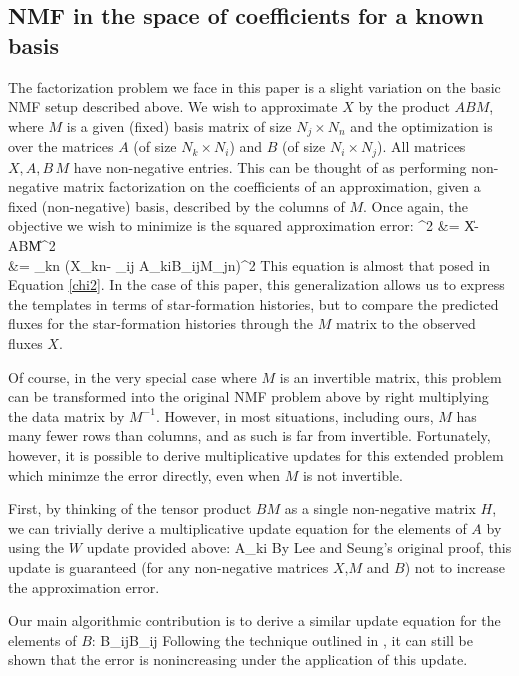 \documentclass[10pt,preprint]{aastex}
\def\beq#1\eeq{\begin{equation}#1\end{equation}}
\def\beqa#1\eeqa{\begin{align}#1\end{align}}
\newcommand{\T}{^{\scriptscriptstyle \top}}
\newcommand{\inv}{^{-1}}
\newcommand{\XX}{X}
\newcommand{\Xkn}{X_{kn}}
\renewcommand{\AA}{A}
\newcommand{\WW}{W}
\newcommand{\HH}{H}
\newcommand{\BB}{B}
\newcommand{\MM}{M}
\newcommand{\Aki}{A_{ki}}
\newcommand{\Bij}{B_{ij}}
\newcommand{\Mjn}{M_{jn}}
\begin{document}
\subsection{NMF in the space of coefficients for a known basis}
The factorization problem we face in this paper is a slight variation on the
basic NMF setup described above. We wish to approximate $\XX$ by the
product $\AA\BB\MM$, 
where $\MM$ is a given (fixed) basis matrix of size $N_j \times N_n$
and the optimization is over the matrices $\AA$ (of size
$N_k\times N_i$) and $\BB$ (of size $N_i\times N_j$). All matrices
$\XX,\AA,\BB\,\MM$ have non-negative entries. This can be thought of
as performing non-negative matrix factorization on the coefficients of
an approximation, given a fixed (non-negative) basis, described by the
columns of $\MM$. Once again, the objective we wish to minimize is the
squared approximation error: 
\beqa 
\chi^2 &= \|\XX-\AA\BB\MM\|^2\\
&= \sum_{kn} \left(\Xkn - \sum_{ij} \Aki\Bij\Mjn \right)^2
\eeqa
This equation is almost that posed in Equation \ref{chi2}.
In the case of this paper, this generalization allows us to express
the templates in terms of star-formation histories, but to compare the
predicted fluxes for the star-formation histories through the $\MM$
matrix to the observed fluxes $\XX$.

Of course, in the very special case where $\MM$ is an invertible
matrix, this problem can be transformed into the original NMF problem above by
right multiplying the data matrix by $\MM\inv$. However, in most
situations, including ours, $\MM$ has many fewer rows than columns, and
as such is far from invertible. Fortunately, however, it is possible
to derive multiplicative updates for this extended problem 
which minimze the error directly, even when $\MM$ is not invertible.

First, by thinking of the tensor product $\BB\MM$ as a single
non-negative matrix $\HH$, we can trivially derive a multiplicative
update equation for the elements of $\AA$ by using the $\WW$ update
provided above: 
\beq
\Aki \leftarrow \Aki 
\frac{[\XX\MM\T\BB\T]_{ki}}{[\AA\BB\MM\MM\T\BB\T]_{ki}}
\eeq
By Lee and Seung's original proof, this update is guaranteed (for any
non-negative matrices $\XX$,$\MM$ and $\BB$) not to increase the
approximation error. 

Our main algorithmic contribution is to derive a similar update equation
for the elements of $\BB$:
\beq \label{eq:bupdate}
\Bij \leftarrow \Bij
\frac{[\AA\T\XX\MM\T]_{ij}}{[\AA\T\AA\BB\MM\MM\T]_{ij}}
\eeq
Following the technique outlined in \cite{lee00a}, it can still be shown
that the error is nonincreasing under the application of this update.
\end{document}
